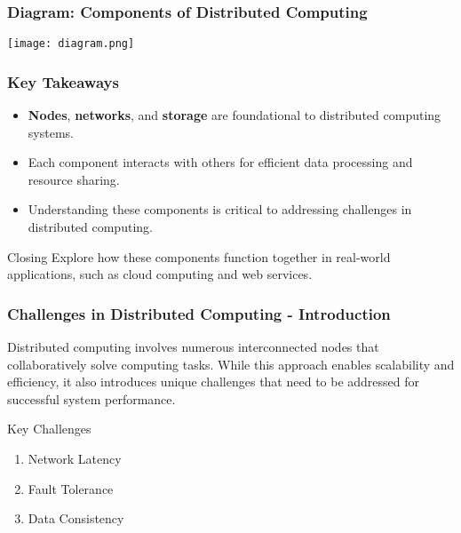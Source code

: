 \documentclass[aspectratio=169]{beamer}
\begin{document}
\begin{frame}[fragile]
    \frametitle{Diagram: Components of Distributed Computing}
    \centering
    \texttt{[image: diagram.png]} %
\end{frame}

\begin{frame}[fragile]
    \frametitle{Key Takeaways}
    \begin{itemize}
        \item \textbf{Nodes}, \textbf{networks}, and \textbf{storage} are foundational to distributed computing systems.
        \item Each component interacts with others for efficient data processing and resource sharing.
        \item Understanding these components is critical to addressing challenges in distributed computing.
    \end{itemize}
    \begin{block}{Closing}
        Explore how these components function together in real-world applications, such as cloud computing and web services.
    \end{block}
\end{frame}

\begin{frame}[fragile]
  \frametitle{Challenges in Distributed Computing - Introduction}
  Distributed computing involves numerous interconnected nodes that collaboratively solve computing tasks. While this approach enables scalability and efficiency, it also introduces unique challenges that need to be addressed for successful system performance.

  \begin{block}{Key Challenges}
    \begin{enumerate}
      \item Network Latency
      \item Fault Tolerance
      \item Data Consistency
    \end{enumerate}
  \end{block}
\end{frame}
\end{document}
